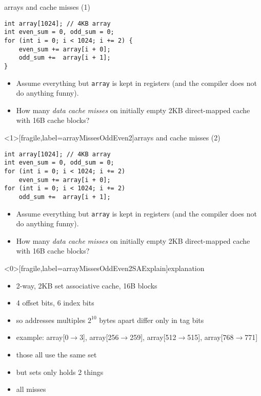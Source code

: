 \begin{frame}[fragile,label=arrayMissesOddEven1]{arrays and cache misses (1)}
\begin{lstlisting}
int array[1024]; // 4KB array
int even_sum = 0, odd_sum = 0;
for (int i = 0; i < 1024; i += 2) {
    even_sum += array[i + 0];
    odd_sum +=  array[i + 1];
}
\end{lstlisting}
    \begin{itemize}
        \item {\small
Assume everything but {\tt array} is kept in registers (and the compiler does not do
            anything funny).}
\item
How many \textit{data cache misses} on initially empty 2KB direct-mapped cache with 16B cache blocks?
    \end{itemize}
\end{frame}

\begin{frame}<1>[fragile,label=arrayMissesOddEven2]{arrays and cache misses (2)}
\begin{lstlisting}
int array[1024]; // 4KB array
int even_sum = 0, odd_sum = 0;
for (int i = 0; i < 1024; i += 2)
    even_sum += array[i + 0];
for (int i = 0; i < 1024; i += 2)
    odd_sum +=  array[i + 1];
\end{lstlisting}
    \begin{itemize}
        \item {\small
    Assume everything but {\tt array} is kept in registers (and the compiler does not do
    anything funny).
        }
    \item
How many \textit{data cache misses} on initially empty 2KB direct-mapped cache with 16B cache blocks?
    \end{itemize}
\end{frame}

\begin{frame}<0>[fragile,label=arrayMissesOddEven2SAExplain]{explanation}
\begin{itemize}
\item 2-way, 2KB set associative cache, 16B blocks
\item 4 offset bits, 6 index bits
\item so addresses multiples $2^{10}$ bytes apart differ only in tag bits
\item example: array[0$\rightarrow$3], array[256$\rightarrow$259], array[512$\rightarrow$515], array[768$\rightarrow$771]
\item those all use the same set
\item but sets only holds 2 things
\item all misses
\end{itemize}
\end{frame}

